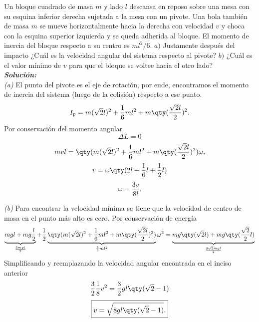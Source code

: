 \begin{mdframed}[style=warning]
	\begin{ejemplo}
		Un bloque cuadrado de masa $m$ y lado $l$ descansa en reposo sobre una mesa con su esquina inferior derecha sujetada a la mesa con un pivote. Una bola también de masa $m$ se mueve horizontalmente hacia la derecha con velocidad $v$ y choca con la esquina superior izquierda y se queda adherida al bloque. El momento de inercia del bloque respecto a su centro es $ml^2 /6$. $a)$ Justamente después del impacto ¿Cuál es la velocidad angular del sistema respecto al pivote? $b)$ ¿Cuál es el valor mínimo de $v$ para que el bloque se voltee hacia el otro lado? \\[0.5cm]
		\noindent \textit{\textbf{Solución: }} \\
		\textit{(a)} El punto del pivote es el eje de rotación, por ende, encontramos el momento de inercia del sistema (luego de la colisión) respecto a ese punto.
			$$ I_p = m(\sqrt{2} l)^2 + \frac{1}{6} ml^2 + m\qty(\frac{\sqrt{2} l}{2})^2. $$
		Por conservación del momento angular
			$$ \Delta L = 0 $$
			$$ mvl = \qty(m(\sqrt{2} l)^2 + \frac{1}{6} ml^2 + m\qty(\frac{\sqrt{2} l}{2})^2) \omega , $$
			$$ v = \omega \qty(2l + \frac{1}{6} l + \frac{1}{2} l) $$
			$$ \boxed{ \omega = \frac{3v}{8l}. } $$
			
		\textit{(b)} Para encontrar la velocidad mínima se tiene que la velocidad de centro de masa en el punto más alto es cero. Por conservación de energía
			$$ \underbrace{mgl + mg\frac{l}{2}}_{\frac{3mgl}{2}} + \frac{1}{2} \underbrace{\qty(m(\sqrt{2} l)^2 + \frac{1}{6} ml^2 + m\qty(\frac{\sqrt{2} l}{2})^2)}_{\frac{8}{3} ml^2} \omega ^2 = \underbrace{mg \qty(\sqrt{2} l) + mg\qty(\frac{\sqrt{2}}{2} l)}_{\frac{3\sqrt{2} mgl}{2}} $$
		Simplificando y reemplazando la velocidad angular encontrada en el inciso anterior
			$$ \frac{3}{2} \frac{1}{8} v^2 = \frac{3}{2} gl \qty(\sqrt{2} - 1) $$
			$$ \boxed{ v = \sqrt{8gl \qty(\sqrt{2} - 1)}. } $$
	\end{ejemplo}
\end{mdframed}



\pagebreak



